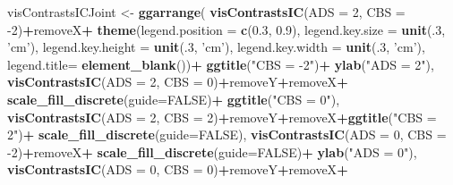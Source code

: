 \documentclass[10pt,dvipsnames,enabledeprecatedfontcommands]{scrartcl}
\newenvironment{Shaded}{\begin{snugshade}}{\end{snugshade}}
\newcommand{\KeywordTok}[1]{\textcolor[rgb]{0.13,0.29,0.53}{\textbf{#1}}}
\newcommand{\DataTypeTok}[1]{\textcolor[rgb]{0.13,0.29,0.53}{#1}}
\newcommand{\DecValTok}[1]{\textcolor[rgb]{0.00,0.00,0.81}{#1}}
\newcommand{\FloatTok}[1]{\textcolor[rgb]{0.00,0.00,0.81}{#1}}
\newcommand{\StringTok}[1]{\textcolor[rgb]{0.31,0.60,0.02}{#1}}
\newcommand{\OtherTok}[1]{\textcolor[rgb]{0.56,0.35,0.01}{#1}}
\newcommand{\OperatorTok}[1]{\textcolor[rgb]{0.81,0.36,0.00}{\textbf{#1}}}
\newcommand{\NormalTok}[1]{#1}
\begin{document}
\begin{Shaded}
\begin{Highlighting}[]
\NormalTok{visContrastsICJoint <-}\StringTok{ }\KeywordTok{ggarrange}\NormalTok{(}
\KeywordTok{visContrastsIC}\NormalTok{(}\DataTypeTok{ADS =} \DecValTok{2}\NormalTok{, }\DataTypeTok{CBS =} \DecValTok{-2}\NormalTok{)}\OperatorTok{+}\NormalTok{removeX}\OperatorTok{+}\StringTok{ }
\StringTok{               }\KeywordTok{theme}\NormalTok{(}\DataTypeTok{legend.position =} \KeywordTok{c}\NormalTok{(}\FloatTok{0.3}\NormalTok{, }\FloatTok{0.9}\NormalTok{),}
                     \DataTypeTok{legend.key.size =} \KeywordTok{unit}\NormalTok{(.}\DecValTok{3}\NormalTok{, }\StringTok{'cm'}\NormalTok{),}
                     \DataTypeTok{legend.key.height =} \KeywordTok{unit}\NormalTok{(.}\DecValTok{3}\NormalTok{, }\StringTok{'cm'}\NormalTok{),}
                     \DataTypeTok{legend.key.width =} \KeywordTok{unit}\NormalTok{(.}\DecValTok{3}\NormalTok{, }\StringTok{'cm'}\NormalTok{),}
                     \DataTypeTok{legend.title=} \KeywordTok{element_blank}\NormalTok{())}\OperatorTok{+}
\StringTok{  }\KeywordTok{ggtitle}\NormalTok{(}\StringTok{"CBS = -2"}\NormalTok{)}\OperatorTok{+}
\StringTok{  }\KeywordTok{ylab}\NormalTok{(}\StringTok{"ADS = 2"}\NormalTok{),}
    \KeywordTok{visContrastsIC}\NormalTok{(}\DataTypeTok{ADS =} \DecValTok{2}\NormalTok{, }\DataTypeTok{CBS =} \DecValTok{0}\NormalTok{)}\OperatorTok{+}\NormalTok{removeY}\OperatorTok{+}\NormalTok{removeX}\OperatorTok{+}\StringTok{ }\KeywordTok{scale_fill_discrete}\NormalTok{(}\DataTypeTok{guide=}\OtherTok{FALSE}\NormalTok{)}\OperatorTok{+}
\StringTok{  }\KeywordTok{ggtitle}\NormalTok{(}\StringTok{"CBS = 0"}\NormalTok{),}
    \KeywordTok{visContrastsIC}\NormalTok{(}\DataTypeTok{ADS =} \DecValTok{2}\NormalTok{, }\DataTypeTok{CBS =} \DecValTok{2}\NormalTok{)}\OperatorTok{+}\NormalTok{removeY}\OperatorTok{+}\NormalTok{removeX}\OperatorTok{+}\KeywordTok{ggtitle}\NormalTok{(}\StringTok{"CBS = 2"}\NormalTok{)}\OperatorTok{+}\StringTok{ }\KeywordTok{scale_fill_discrete}\NormalTok{(}\DataTypeTok{guide=}\OtherTok{FALSE}\NormalTok{),}
\KeywordTok{visContrastsIC}\NormalTok{(}\DataTypeTok{ADS =} \DecValTok{0}\NormalTok{, }\DataTypeTok{CBS =} \DecValTok{-2}\NormalTok{)}\OperatorTok{+}\NormalTok{removeX}\OperatorTok{+}\StringTok{ }\KeywordTok{scale_fill_discrete}\NormalTok{(}\DataTypeTok{guide=}\OtherTok{FALSE}\NormalTok{)}\OperatorTok{+}
\StringTok{  }\KeywordTok{ylab}\NormalTok{(}\StringTok{"ADS = 0"}\NormalTok{),}
    \KeywordTok{visContrastsIC}\NormalTok{(}\DataTypeTok{ADS =} \DecValTok{0}\NormalTok{, }\DataTypeTok{CBS =} \DecValTok{0}\NormalTok{)}\OperatorTok{+}\NormalTok{removeY}\OperatorTok{+}\NormalTok{removeX}\OperatorTok{+}\StringTok{ }

\end{Highlighting}
\end{Shaded}
\end{document}
